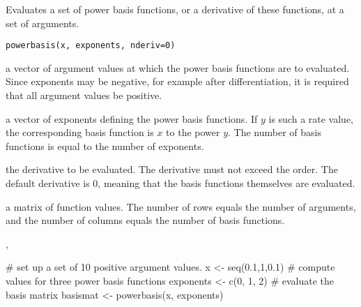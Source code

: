 \documentclass{article}
\begin{document}
\begin{Description}\relax
Evaluates a set of power basis functions, or a derivative of these
functions, at a set of arguments.
\end{Description}
\begin{Usage}
\begin{verbatim}
powerbasis(x, exponents, nderiv=0)
\end{verbatim}
\end{Usage}
\begin{Arguments}
\begin{ldescription}
\item[\code{x}] a vector of argument values at which the power basis functions are to
evaluated. Since exponents may be negative, for example after
differentiation, it is required that all argument values be positive.

\item[\code{exponents}] a vector of exponents defining the power basis functions.  If
$y$ is such a rate value, the corresponding basis function is
$x$ to the power $y$.  The number of basis functions is equal to the
number of exponents.

\item[\code{nderiv}] the derivative to be evaluated.  The derivative must not exceed the
order.  The default derivative is 0, meaning that the basis functions
themselves are evaluated.

\end{ldescription}
\end{Arguments}
\begin{Value}
a matrix of function values.  The number of rows equals the number of
arguments, and the number of columns equals the number of basis
functions.
\end{Value}
\begin{SeeAlso}\relax
{}, 
\end{SeeAlso}
\begin{Examples}
\begin{ExampleCode}

#  set up a set of 10 positive argument values.
x <- seq(0.1,1,0.1)
#  compute values for three power basis functions
exponents <- c(0, 1, 2)
#  evaluate the basis matrix
basismat <- powerbasis(x, exponents)

\end{ExampleCode}
\end{Examples}
\end{document}
